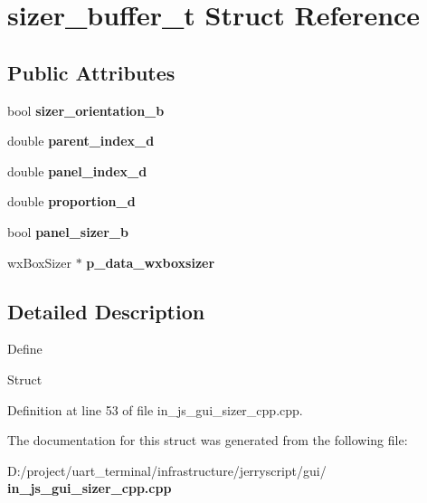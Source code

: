 \section{sizer\+\_\+buffer\+\_\+t Struct Reference}
\label{structsizer__buffer__t}
\subsection*{Public Attributes}
\begin{DoxyCompactItemize}
\item 
\mbox{\label{structsizer__buffer__t_a9022a2fd6e5ff1146f620586ebfd238f}} 
bool {\bfseries sizer\+\_\+orientation\+\_\+b}
\item 
\mbox{\label{structsizer__buffer__t_aae266a5626d1a73af6684d9f24dc9da2}} 
double {\bfseries parent\+\_\+index\+\_\+d}
\item 
\mbox{\label{structsizer__buffer__t_ad4bcfb8b2242651967dadd04d429e8e2}} 
double {\bfseries panel\+\_\+index\+\_\+d}
\item 
\mbox{\label{structsizer__buffer__t_a85f69365bd381285c2af79b4c3cd7761}} 
double {\bfseries proportion\+\_\+d}
\item 
\mbox{\label{structsizer__buffer__t_a685f60612a16dad1bcb46a8645ff86fd}} 
bool {\bfseries panel\+\_\+sizer\+\_\+b}
\item 
\mbox{\label{structsizer__buffer__t_a87a7424cf386c08d2a81400ed2313138}} 
wx\+Box\+Sizer $\ast$ {\bfseries p\+\_\+data\+\_\+wxboxsizer}
\end{DoxyCompactItemize}


\subsection{Detailed Description}
Define

Struct 

Definition at line 53 of file in\+\_\+js\+\_\+gui\+\_\+sizer\+\_\+cpp.\+cpp.



The documentation for this struct was generated from the following file\+:\begin{DoxyCompactItemize}
\item 
D\+:/project/uart\+\_\+terminal/infrastructure/jerryscript/gui/\textbf{ in\+\_\+js\+\_\+gui\+\_\+sizer\+\_\+cpp.\+cpp}\end{DoxyCompactItemize}
